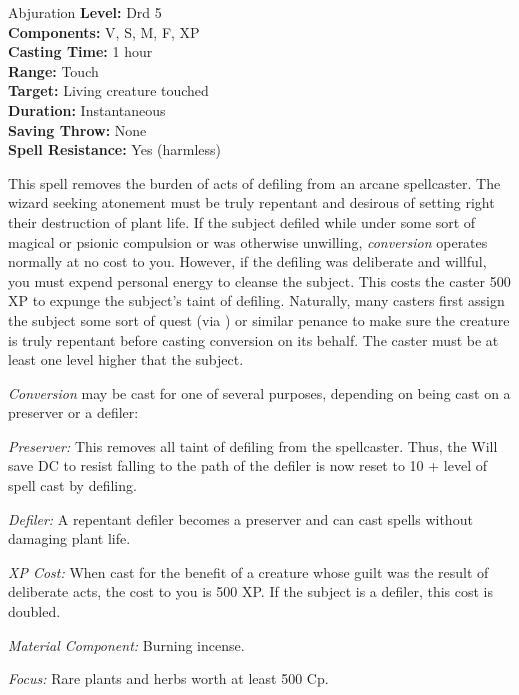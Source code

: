 {Abjuration}
{
	\textbf{Level:}
	Drd 5\\
	\textbf{Components:}
	V, S, M, F, XP\\
	\textbf{Casting Time:}
	1 hour\\
	\textbf{Range:}
	Touch\\
	\textbf{Target:}
	Living creature touched\\
	\textbf{Duration:}
	Instantaneous\\
	\textbf{Saving Throw:}
	None\\
	\textbf{Spell Resistance:}
	Yes (harmless)\\
}
{
	This spell removes the burden of acts of defiling from an arcane spellcaster. The wizard seeking atonement must be truly repentant and desirous of setting right their destruction of plant life. If the subject defiled while under some sort of magical or psionic compulsion or was otherwise unwilling, \emph{conversion} operates normally at no cost to you. However, if the defiling was deliberate and willful, you must expend personal energy to cleanse the subject. This costs the caster 500 XP to expunge the subject's taint of defiling. Naturally, many casters first assign the subject some sort of quest (via ) or similar penance to make sure the creature is truly repentant before casting conversion on its behalf. The caster must be at least one level higher that the subject.

	\emph{Conversion} may be cast for one of several purposes, depending on being cast on a preserver or a defiler:	
	\begin{itemize*}
	\item \textit{Preserver:} This removes all taint of defiling from the spellcaster. Thus, the Will save DC to resist falling to the path of the defiler is now reset to 10 + level of spell cast by defiling.
	\item \textit{Defiler:} A repentant defiler becomes a preserver and can cast spells without damaging plant life.
	\end{itemize*}

	\textit{XP Cost:} When cast for the benefit of a creature whose guilt was the result of deliberate acts, the cost to you is 500 XP. If the subject is a defiler, this cost is doubled.

	\textit{Material Component:} Burning incense.

	\textit{Focus:} Rare plants and herbs worth at least 500 Cp.
}
